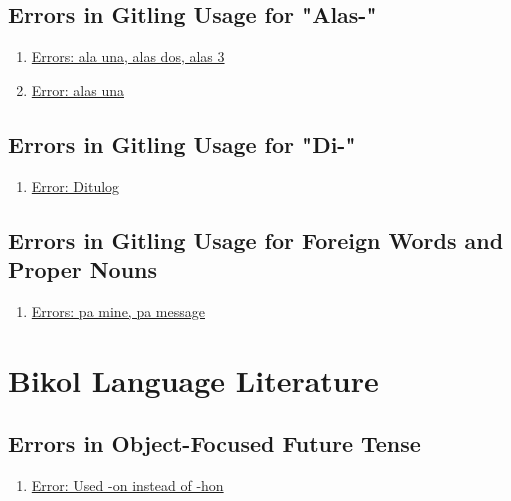 \subsection{Errors in Gitling Usage for "Alas-"}

\begin{enumerate}
    \item \href{https://www.facebook.com/story.php/?story_fbid=1295438683977541&id=1109330399255038&_rdr}{Errors: ala una, alas dos, alas 3}
    \item \href{https://www.instagram.com/starsalon_aesthetics/p/DEq4K39SCT_/}{Error: alas una}
\end{enumerate}

\subsection{Errors in Gitling Usage for "Di-"}

\begin{enumerate}
    \item \href{https://www.facebook.com/share/p/1XLwWpBFJW/}{Error: Ditulog}
    
\end{enumerate}

\subsection{Errors in Gitling Usage for Foreign Words and Proper Nouns}

\begin{enumerate}
    \item \href{https://www.facebook.com/groups/2121876361169013/posts/9651859028170671/}{Errors: pa mine, pa message}
\end{enumerate}

\section{Bikol Language Literature}

\subsection{Errors in Object-Focused Future Tense}
\begin{enumerate}
    \item \href{https://www.reddit.com/r/Bicol/comments/1gai74l/ano_ang_dapat_gibuon_kung_nabaha_an_sakyan_mo/}{Error: Used -on instead of -hon}
\end{enumerate}

